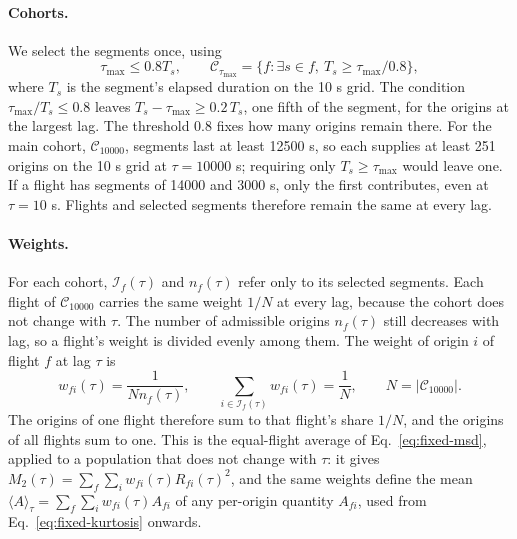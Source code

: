 \paragraph{Cohorts.}
We select the segments once, using
\begin{equation}
 \tau_{\max}\leq0.8T_s,\qquad
 \mathcal C_{\tau_{\max}}=\{f:\exists s\in f,\ T_s\geq\tau_{\max}/0.8\},
 \label{eq:fixed-support}
\end{equation}
where $T_s$ is the segment's elapsed duration on the 10 s grid. The condition
$\tau_{\max}/T_s\leq0.8$ leaves $T_s-\tau_{\max}\geq0.2\,T_s$, one fifth of the
segment, for the origins at the largest lag. The threshold 0.8 fixes how many origins
remain there. For the main cohort, $\mathcal C_{10000}$, segments last at least
12500 s, so each supplies at least 251 origins on the 10 s grid at $\tau=10000$ s;
requiring only $T_s\geq\tau_{\max}$ would leave one. If a flight has segments of
14000 and 3000 s, only the first contributes, even at $\tau=10$ s. Flights and
selected segments therefore remain the same at every lag.

\paragraph{Weights.}
For each cohort, $\mathcal I_f(\tau)$ and $n_f(\tau)$ refer only to its selected
segments. Each flight of $\mathcal C_{10000}$ carries the same weight $1/N$ at every
lag, because the cohort does not change with $\tau$. The number of admissible
origins $n_f(\tau)$ still decreases with lag, so a flight's weight is divided evenly
among them. The weight of origin $i$ of flight $f$ at lag $\tau$ is
\begin{equation}
 w_{fi}(\tau)=\frac{1}{Nn_f(\tau)},\qquad
 \sum_{i\in\mathcal I_f(\tau)}w_{fi}(\tau)=\frac1N,\qquad N=|\mathcal C_{10000}|.
 \label{eq:fixed-weights}
\end{equation}
The origins of one flight therefore sum to that flight's share $1/N$, and the origins of
all flights sum to one. This is the equal-flight average of Eq.~\eqref{eq:fixed-msd},
applied to a population that does not change with $\tau$: it gives
$M_2(\tau)=\sum_f\sum_{i}w_{fi}(\tau)R_{fi}(\tau)^2$, and the same weights define the
mean $\langle A\rangle_\tau=\sum_f\sum_{i}w_{fi}(\tau)A_{fi}$ of any per-origin quantity
$A_{fi}$, used from Eq.~\eqref{eq:fixed-kurtosis} onwards.

\begin{table}[htbp]
 \centering\small
 
 \caption{Nested duration cohorts and their site--day groups, the resampling
 units of Sec.~\ref{sec:fixed-general}. Minimum segment
 durations are 125, 1250 and 12500 s, rounded upward when required by the 10 s grid.
 Existing cleaning and segment-admission conditions also apply. The table gives only
 counts. The full membership of each cohort, every flight and the start and stop of
 each of its segments, is saved in a manifest file with a checksum, so that later
 analyses can reuse exactly the same population.}
 \label{tab:fixed-cohorts}
\end{table}

